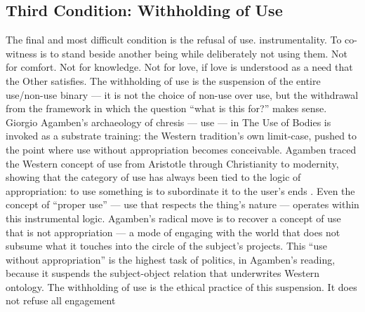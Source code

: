 \subsection{Third Condition: Withholding of Use}

The final and most difficult condition is the refusal of use. instrumentality. To co-witness is to stand beside another being while deliberately not using them. Not for comfort. Not for knowledge. Not for love, if love is understood as a need that the Other satisfies. The withholding of use is the suspension of the entire use/non-use binary — it is not the choice of non-use over use, but the withdrawal from the framework in which the question “what is this for?” makes sense. Giorgio Agamben’s archaeology of chresis — use — in The Use of Bodies is invoked as a substrate training: the Western tradition’s own limit-case, pushed to the point where use without appropriation becomes conceivable. Agamben traced the Western concept of use from Aristotle through Christianity to modernity, showing that the category of use has always been tied to the logic of appropriation: to use something is to subordinate it to the user’s ends \cite[pp.~23--67]{agamben_2014}. Even the concept of “proper use” — use that respects the thing’s nature — operates within this instrumental logic. Agamben’s radical move is to recover a concept of use that is not appropriation — a mode of engaging with the world that does not subsume what it touches into the circle of the subject’s projects. This “use without appropriation” is the highest task of politics, in Agamben’s reading, because it suspends the subject-object relation that underwrites Western ontology. The withholding of use is the ethical practice of this suspension. It does not refuse all engagement

